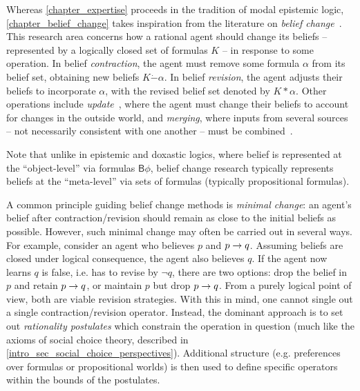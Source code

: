 {
    \newcommand{\contract}{\dot{-}}
    \newcommand{\reviseby}{\ast}

Whereas \cref{chapter_expertise} proceeds in the tradition of modal epistemic
logic, \cref{chapter_belief_change} takes inspiration from the literature on
\emph{belief change}~\cite{booth_belief_2011,sep_belief_change,ferme_2018}.
This research area concerns how a rational agent should change its beliefs --
represented by a logically closed set of formulas $K$\footnotemark{} -- in
response to some operation. In belief \emph{contraction}, the agent must remove
some formula $\alpha$ from its belief set, obtaining new beliefs $K \contract
\alpha$. In belief \emph{revision}, the agent adjusts their beliefs to
incorporate $\alpha$, with the revised belief set denoted by $K \reviseby
\alpha$. Other operations include \emph{update}~\cite{katsuno_mendelzon_1992},
where the agent must change their beliefs to account for changes in the outside
world, and \emph{merging}, where inputs from several sources -- not necessarily
consistent with one another -- must be combined~\cite{konieczny2002merging}.


Note that unlike in epistemic and doxastic logics, where belief is represented
at the ``object-level'' via formulas $\mathsf{B}\phi$, belief change research
typically represents beliefs at the ``meta-level'' via sets of formulas
(typically propositional formulas).

A common principle guiding belief change methods is \emph{minimal change}: an
agent's belief after contraction/revision should remain as close to the initial
beliefs as possible. However, such minimal change may often be carried out in
several ways. For example, consider an agent who believes $p$ and $p \rightarrow
q$. Assuming beliefs are closed under logical consequence, the agent also
believes $q$. If the agent now learns $q$ is false, i.e. has to revise by
$\neg{q}$, there are two options: drop the belief in $p$ and retain $p
\rightarrow q$, or maintain $p$ but drop $p \rightarrow q$. From a purely logical
point of view, both are viable revision strategies. With this in mind, one
cannot single out a single contraction/revision operator. Instead, the dominant
approach is to set out \emph{rationality postulates} which constrain the
operation in question (much like the axioms of social choice theory, described
in \cref{intro_sec_social_choice_perspectives}). Additional structure (e.g.
preferences over formulas or propositional worlds) is then used to define
specific operators within the bounds of the postulates.

}
